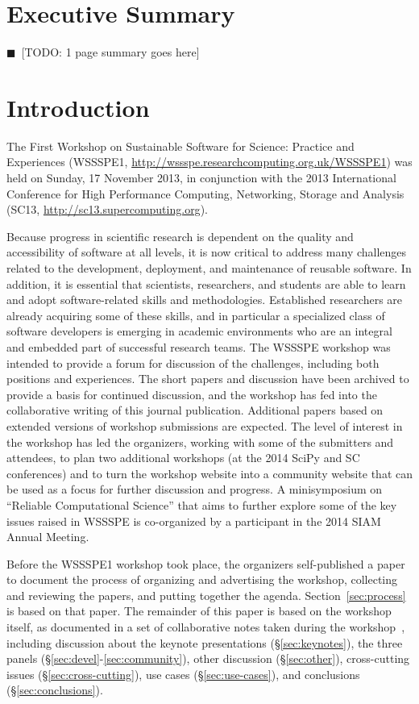 \documentclass[11pt, oneside]{amsart}
\newcommand{\todo}[1]{{\color{blue}$\blacksquare$~\textsf{[TODO: #1]}}}
\begin{document}
\pagebreak

\section*{Executive Summary}

\todo{1 page summary goes here}

\pagebreak

\section{Introduction}

The First Workshop on Sustainable Software for Science: Practice and
Experiences (WSSSPE1,
\url{http://wssspe.researchcomputing.org.uk/WSSSPE1}) was held on
Sunday, 17 November 2013, in conjunction with the 2013 International
Conference for High Performance Computing, Networking, Storage and
Analysis (SC13, \url{http://sc13.supercomputing.org}).

Because progress in scientific research is dependent on the quality
and accessibility of software at all levels, it is now critical to
address many challenges related to the development, deployment, and
maintenance of reusable software. In addition, it is essential that
scientists, researchers, and students are able to learn and adopt
software-related skills and methodologies. Established researchers are
already acquiring some of these skills, and in particular a
specialized class of software developers is emerging in academic
environments who are an integral and embedded part of successful
research teams. The WSSSPE workshop was intended to provide a forum
for discussion of the challenges, including both positions and
experiences.  The short papers and discussion have been archived to
provide a basis for continued discussion, and the workshop has fed
into the collaborative writing of this journal publication.
Additional papers based on extended versions of workshop submissions
are expected.  The level of interest in the workshop has led the
organizers, working with some of the submitters and attendees, to plan
two additional workshops (at the 2014 SciPy and SC conferences) and to
turn the workshop website into a community website that can be used as
a focus for further discussion and progress.  A minisymposium on
``Reliable Computational Science'' that aims to further explore some
of the key issues raised in WSSSPE is co-organized by a participant in
the 2014 SIAM Annual Meeting.

Before the WSSSPE1 workshop took place, the organizers self-published
a paper~\cite{WSSSPE1-pre-report} to document the process of
organizing and advertising the workshop, collecting and reviewing the
papers, and putting together the agenda.  Section~\ref{sec:process} is
based on that paper.  The remainder of this paper is based on the
workshop itself, as documented in a set of collaborative notes taken
during the workshop~\cite{WSSSPE1-google-notes}, including discussion
about the keynote presentations (\S\ref{sec:keynotes}), the three
panels (\S\ref{sec:devel}-\ref{sec:community}), other discussion
(\S\ref{sec:other}), cross-cutting issues (\S\ref{sec:cross-cutting}),
use cases (\S\ref{sec:use-cases}), and conclusions
(\S\ref{sec:conclusions}).
\end{document}
